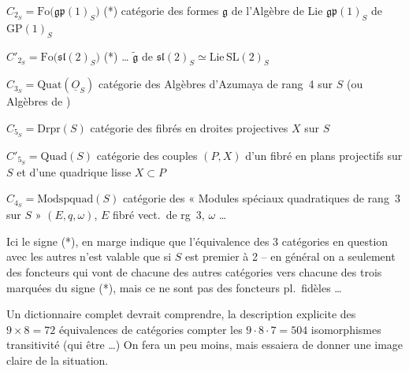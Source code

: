 \documentclass[11pt,a4paper]{article}
\begin{document}

$C_{2_S} = \mathrm{Fo}\bigl(\mathfrak{gp}(1)_S\bigr)$ (*) catégorie des formes $\mathfrak{g}$ de l'Algèbre de Lie
$\mathfrak{gp}(1)_S$ de $\mathrm{GP}(1)_S$

$C'_{2_S} = \mathrm{Fo}\bigl(\mathfrak{sl}(2)_S\bigr)$ (*)  \ldots{} $\widetilde{\mathfrak{g}}$ de
$\mathfrak{sl}(2)_S \simeq \mathrm{Lie}\, \mathrm{SL}(2)_S$


$C_{3_S} = \mathrm{Quat}(\underline{O}_S)$ catégorie des Algèbres d'Azumaya  de
rang~4 sur $S$ (ou Algèbres de )

$C_{5_S} = \mathrm{Drpr}(S)$ catégorie des fibrés en droites projectives $X$ sur $S$

$C'_{5_S} = \mathrm{Quad}(S)$ catégorie des couples $(P, X)$ d'un fibré en plans projectifs
sur $S$ et d'une quadrique lisse $X \subset P$

$C_{4_S} = \mathrm{Modspquad}(S)$ catégorie des « Modules spéciaux quadratiques de rang~3 sur $S$ »
$(E, q, \omega)$, $E$ fibré vect.\ de rg~3, $\omega$ \ldots
{}

Ici le signe (*), en marge indique que l'équivalence des 3 catégories en
question avec les  autres n'est valable que si $S$ est premier à 2
-- en général on a seulement des foncteurs qui vont de chacune des
 autres catégories vers chacune des trois marquées du signe (*),
mais ce ne sont pas des foncteurs pl.\ fidèles \ldots
{}

Un dictionnaire complet devrait comprendre,  la description
explicite des $9 \times 8 = 72$ équivalences de catégories \ill{}
compter les \struck{\ill{}} $9 \cdot 8 \cdot 7 = 504$ isomorphismes
 transitivité (qui  être 
\ldots) On fera un peu moins, mais  essaiera de donner une image
claire de la situation.
\end{document}
